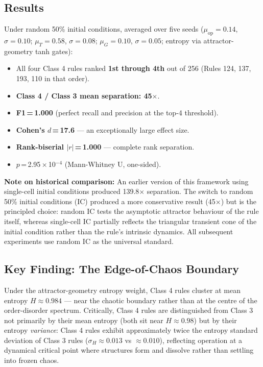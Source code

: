 \documentclass[12pt,a4paper]{article}
\begin{document}
\subsection{Results}

Under random 50\% initial conditions, averaged over five seeds
($\mu_\text{op} = 0.14$, $\sigma = 0.10$;
$\mu_T = 0.58$, $\sigma = 0.08$;
$\mu_G = 0.10$, $\sigma = 0.05$;
entropy via attractor-geometry tanh gates):

\begin{itemize}[noitemsep]
  \item All four Class 4 rules ranked \textbf{1st through 4th} out of 256
        (Rules 124, 137, 193, 110 in that order).
  \item \textbf{Class 4 / Class 3 mean separation: 45$\times$}.
  \item \textbf{F1\,=\,1.000} (perfect recall and precision at the top-4 threshold).
  \item \textbf{Cohen's $d$\,=\,17.6} — an exceptionally large effect size.
  \item \textbf{Rank-biserial $|r|$\,=\,1.000} — complete rank separation.
  \item $p$\,=\,2.95\,×\,10$^{-4}$ (Mann-Whitney U, one-sided).
\end{itemize}

\noindent\textbf{Note on historical comparison:} An earlier version of
this framework using single-cell initial conditions produced 139.8$\times$
separation.
The switch to random 50\% initial conditions (IC) produced a more
conservative result (45$\times$) but is the principled choice: random IC
tests the asymptotic attractor behaviour of the rule itself, whereas
single-cell IC partially reflects the triangular transient cone of the
initial condition rather than the rule's intrinsic dynamics.
All subsequent experiments use random IC as the universal standard.

\subsection{Key Finding: The Edge-of-Chaos Boundary}

Under the attractor-geometry entropy weight, Class 4 rules cluster at
mean entropy $H \approx 0.984$ — near the chaotic boundary rather
than at the centre of the order-disorder spectrum.
Critically, Class 4 rules are distinguished from Class 3 not primarily
by their mean entropy (both sit near $H \approx 0.98$) but by their
entropy \emph{variance}: Class 4 rules exhibit approximately twice the
entropy standard deviation of Class 3 rules ($\sigma_H \approx 0.013$
vs $\approx 0.010$), reflecting operation at a dynamical critical
point where structures form and dissolve rather than settling into
frozen chaos.
\end{document}
